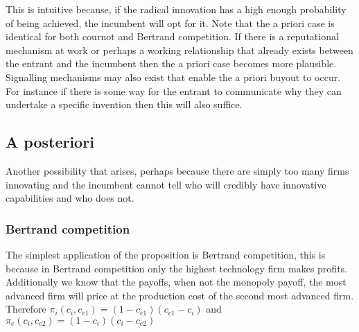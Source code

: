 \documentclass[11pt]{article}
\begin{document}
This is intuitive because, if the radical innovation has a high enough probability of being achieved, the incumbent will opt for it. Note that the a priori case is identical for both cournot and Bertrand competition. If there is a reputational mechanism at work or perhaps a working relationship that already exists between the entrant and the incumbent then the a priori case becomes more plausible. Signalling mechanisms may also exist that enable the a priori buyout to occur. For instance if there is some way for the entrant to communicate why they can undertake a specific invention then this will also suffice.

\subsection{A posteriori}
Another possibility that arises, perhaps because there are simply too many firms innovating and the incumbent cannot tell who will credibly have innovative capabilities and who does not.

\subsubsection*{Bertrand competition}


The simplest application of the proposition is Bertrand competition, this is because in Bertrand competition only the highest technology firm makes profits. Additionally we know that the payoffs, when not the monopoly payoff, the most advanced firm will price at the production cost of the second most advanced firm. Therefore $\pi_i(c_i,c_{e1})= (1-c_{e1})(c_{e1}-c_i)$ and $\pi_e(c_i,c_{e2})= (1-c_{i})(c_{i}-c_{e2})$

 
\end{document}
